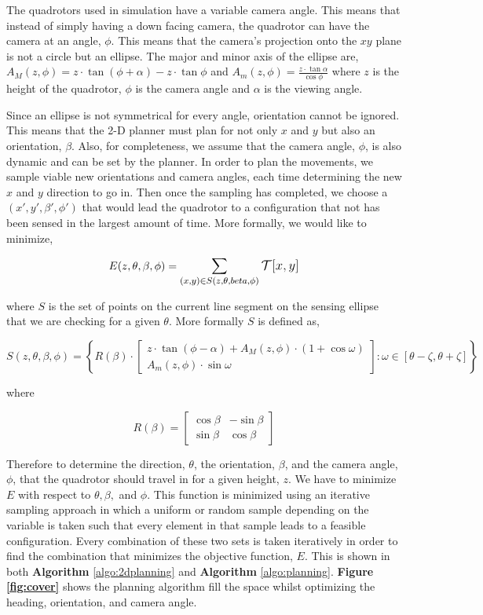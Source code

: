 \documentclass[12pt]{article}
\newcommand{\fig}[1]{\textbf{Figure \ref{fig:#1}}}
\begin{document}
The quadrotors used in simulation have a variable camera angle. This means that
instead of simply having a down facing camera, the quadrotor can have the
camera at an angle, $\phi$. This means that the camera's projection onto the
$xy$ plane is not a circle but an ellipse. The major and minor axis of the
ellipse are, $ A_M(z, \phi) = z \cdot \tan{(\phi + \alpha)} - z \cdot
\tan{\phi} $ and $ A_m(z, \phi) = \frac{z \cdot \tan{\alpha}}{\cos{\phi}} $
where $z$ is the height of the quadrotor, $\phi$ is the camera angle and
$\alpha$ is the viewing angle.

Since an ellipse is not symmetrical for every angle, orientation cannot be
ignored.  This means that the 2-D planner must plan for not only $x$ and $y$
but also an orientation, $\beta$. Also, for completeness, we assume that the
camera angle, $\phi$, is also dynamic and can be set by the planner. In order
to plan the movements, we sample viable new orientations and camera angles,
each time determining the new $x$ and $y$ direction to go in.  Then once the
sampling has completed, we choose a $(x', y',
\beta', \phi')$ that would lead the quadrotor to a configuration that not has
been sensed in the largest amount of time. More formally, we would like to
minimize,

$$ E(z, \theta, \beta, \phi) = \mathlarger{\sum_{(x, y) \in S(z,
            \theta, beta, \phi)}{\mathcal{T}[x, y]}}$$

where $S$ is the set of points on the current line segment on the sensing
ellipse that we are checking for a given $\theta$. More formally $S$ is defined
as,

$$ S(z, \theta, \beta, \phi) = \left\{ R(\beta) \cdot \begin{bmatrix} z \cdot
        \tan(\phi - \alpha) + A_M(z, \phi)
            \cdot (1 + \cos{\omega}) \\[0.2em]
    A_m(z, \phi) \cdot \sin{\omega} \end{bmatrix} : \omega \in [\theta - \zeta, \theta + \zeta] \right\}$$

where

$$R(\beta) = \begin{bmatrix}
\cos{\beta} & -\sin{\beta} \\[0.2em] \sin{\beta} & \cos{\beta} \end{bmatrix}$$

Therefore to determine the direction, $\theta$, the orientation, $\beta$, and
the camera angle, $\phi$, that the quadrotor should travel in for a given
height, $z$.  We have to minimize $E$ with respect to $\theta, \beta,$ and
$\phi$. This function is minimized using an iterative sampling approach in
which a uniform or random sample depending on the variable is taken such that
every element in that sample leads to a feasible configuration. Every
combination of these two sets is taken iteratively in order to find the
combination that minimizes the objective function, $E$. This is shown in both
\textbf{Algorithm} \ref{algo:2dplanning} and \textbf{Algorithm}
\ref{algo:planning}. \fig{cover} shows the planning algorithm fill the space
whilst optimizing the heading, orientation, and camera angle.
\end{document}
